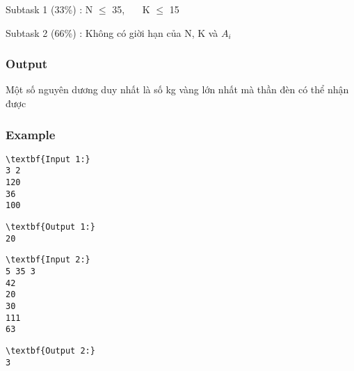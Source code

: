 Subtask 1 (33\%) : N  $\le$  35,    K  $\le$  15

Subtask 2 (66\%) : Không có giời hạn của N, K và $A_{i}$

\subsubsection{Output}

Một số nguyên dương duy nhất là số kg vàng lớn nhất mà thần đèn có thể nhận được

\subsubsection{Example}
\begin{verbatim}
\textbf{Input 1:}
3 2
120
36
100\end{verbatim}
\begin{verbatim}
\textbf{Output 1:}
20\end{verbatim}
\begin{verbatim}
\textbf{Input 2:}
5 35 3
42
20
30
111
63\end{verbatim}
\begin{verbatim}
\textbf{Output 2:}
3
\end{verbatim}
